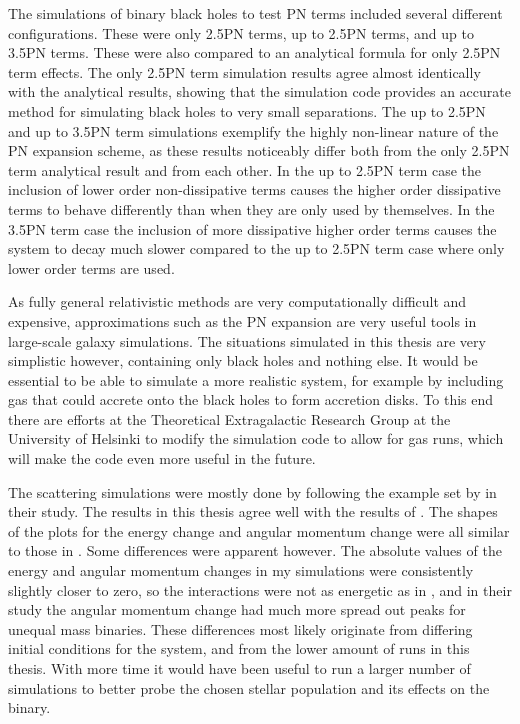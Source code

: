 \documentclass[english, oneside]{HYgradu}
\begin{document}
The simulations of binary black holes to test PN terms included several different configurations. These were only 2.5PN terms, up to 2.5PN terms, and up to 3.5PN terms. These were also compared to an analytical formula for only 2.5PN term effects. The only 2.5PN term simulation results agree almost identically with the analytical results, showing that the simulation code provides an accurate method for simulating black holes to very small separations. The up to 2.5PN and up to 3.5PN term simulations exemplify the highly non-linear nature of the PN expansion scheme, as these results noticeably differ both from the only 2.5PN term analytical result and from each other. In the up to 2.5PN term case the inclusion of lower order non-dissipative terms causes the higher order dissipative terms to behave differently than when they are only used by themselves. In the 3.5PN term case the inclusion of more dissipative higher order terms causes the system to decay much slower compared to the up to 2.5PN term case where only lower order terms are used. 

As fully general relativistic methods are very computationally difficult and expensive, approximations such as the PN expansion are very useful tools in large-scale galaxy simulations. The situations simulated in this thesis are very simplistic however, containing only black holes and nothing else. It would be essential to be able to simulate a more realistic system, for example by including gas that could accrete onto the black holes to form accretion disks. To this end there are efforts at the Theoretical Extragalactic Research Group at the University of Helsinki to modify the simulation code to allow for gas runs, which will make the code even more useful in the future.

The scattering simulations were mostly done by following the example set by \cite{sesana:2006} in their study. The results in this thesis agree well with the results of \citeauthor{sesana:2006}. The shapes of the plots for the energy change and angular momentum change were all similar to those in \citeauthor{sesana:2006}. Some differences were apparent however. The absolute values of the energy and angular momentum changes in my simulations were consistently slightly closer to zero, so the interactions were not as energetic as in \citeauthor{sesana:2006}, and in their study the angular momentum change had much more spread out peaks for unequal mass binaries. These differences most likely originate from differing initial conditions for the system, and from the lower amount of runs in this thesis. With more time it would have been useful to run a larger number of simulations to better probe the chosen stellar population and its effects on the binary.
\end{document}
